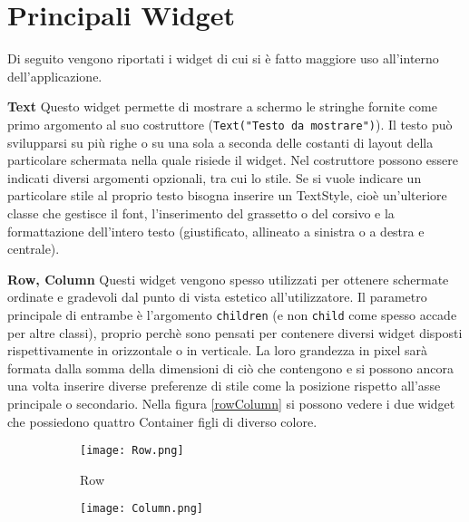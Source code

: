 	\section{Principali Widget}
	Di seguito vengono riportati i widget di cui si è fatto maggiore uso
	all'interno dell'applicazione.
	
	\begin{trivlist}
		\item \textbf{Text} \newline
		Questo widget permette di mostrare a schermo le stringhe fornite come
		primo argomento al suo costruttore (\verb|Text("Testo da mostrare")|).
		Il testo può svilupparsi su più righe o su una sola a seconda delle
		costanti di layout della particolare schermata nella quale risiede il
		widget. Nel costruttore possono essere indicati diversi argomenti
		opzionali, tra cui lo stile. Se si vuole indicare un particolare stile
		al proprio testo bisogna inserire un TextStyle, cioè un'ulteriore classe
		che gestisce il font, l'inserimento del grassetto o del corsivo e la
		formattazione dell'intero testo (giustificato, allineato a sinistra o a
		destra e centrale).  
		\item \textbf{Row, Column} \newline
		Questi widget vengono spesso utilizzati per ottenere schermate ordinate
		e gradevoli dal punto di vista estetico all'utilizzatore. Il parametro
		principale di entrambe è l'argomento \verb|children| (e non \verb|child| come
		spesso accade per altre classi), proprio perchè sono pensati per
		contenere diversi widget disposti rispettivamente in orizzontale o in
		verticale. La loro grandezza in pixel sarà formata dalla somma della
		dimensioni di ciò che contengono e si possono ancora una volta inserire diverse
		preferenze di stile come la posizione rispetto all'asse principale o
		secondario. Nella figura \ref{rowColumn} si possono vedere i due widget
		che possiedono quattro Container figli di diverso colore.
		\begin{figure}[h!]
			\centering
			\begin{subfigure}{0.3\linewidth}
				\texttt{[image: Row.png]}
				\caption{Row}
			\end{subfigure}
			\begin{subfigure}{0.3\linewidth}
				\texttt{[image: Column.png]}

\end{subfigure}
\end{figure}
\end{trivlist}
